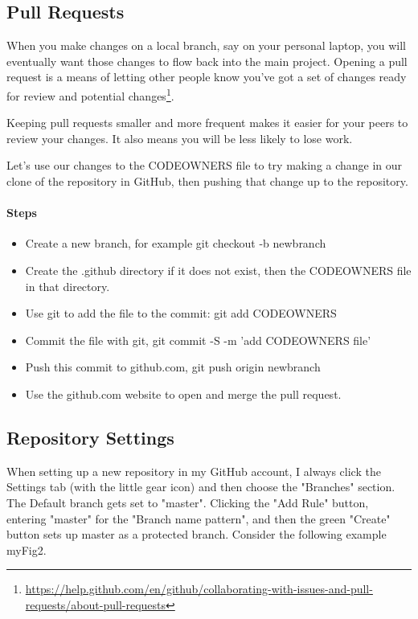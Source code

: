 \subsection{Pull Requests}

\justify
When you make changes on a local branch, say on your personal laptop,
you will eventually want those changes to flow back into the main
project. Opening a pull request is a means of letting other people know
you've got a set of changes ready for review and potential
changes\footnote{\url{https://help.github.com/en/github/collaborating-with-issues-and-pull-requests/about-pull-requests}}.

\justify
Keeping pull requests smaller and more frequent makes it easier for your
peers to review your changes. It also means you will be less likely to
lose work.

\justify
Let's use our changes to the CODEOWNERS file to try making a change in
our clone of the repository in GitHub, then pushing that change up to
the repository.

\hypertarget{steps-4}{%
\paragraph{Steps}\label{steps-4}}

\begin{itemize}

\item
  Create a new branch, for example git checkout -b newbranch
\item
  Create the .github directory if it does not exist, then the CODEOWNERS
  file in that directory.
\item
  Use git to add the file to the commit: git add CODEOWNERS
\item
  Commit the file with git, git commit -S -m 'add CODEOWNERS file'
\item
  Push this commit to github.com, git push origin newbranch
\item
  Use the github.com website to open and merge the pull request.
\end{itemize}


\subsection{Repository Settings}

\justify
When setting up a new repository in my GitHub account, I always click
the Settings tab (with the little gear icon) and then choose the
"Branches" section. The Default branch gets set to "master". Clicking
the "Add Rule" button, entering "master" for the "Branch name pattern",
and then the green "Create" button sets up master as a protected branch.
Consider the following example {myFig2}.

